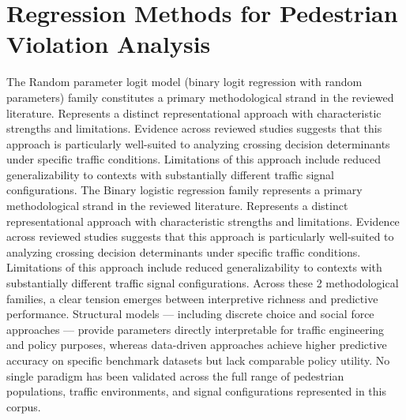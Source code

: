 \documentclass{article}
\begin{document}
\section{Regression Methods for Pedestrian Violation Analysis}
The Random parameter logit model (binary logit regression with random parameters) family constitutes a primary methodological strand in the reviewed literature. Represents a distinct representational approach with characteristic strengths and limitations. Evidence across reviewed studies suggests that this approach is particularly well-suited to analyzing crossing decision determinants under specific traffic conditions. Limitations of this approach include reduced generalizability to contexts with substantially different traffic signal configurations. The Binary logistic regression family represents a primary methodological strand in the reviewed literature. Represents a distinct representational approach with characteristic strengths and limitations. Evidence across reviewed studies suggests that this approach is particularly well-suited to analyzing crossing decision determinants under specific traffic conditions. Limitations of this approach include reduced generalizability to contexts with substantially different traffic signal configurations. Across these 2 methodological families, a clear tension emerges between interpretive richness and predictive performance. Structural models — including discrete choice and social force approaches — provide parameters directly interpretable for traffic engineering and policy purposes, whereas data-driven approaches achieve higher predictive accuracy on specific benchmark datasets but lack comparable policy utility. No single paradigm has been validated across the full range of pedestrian populations, traffic environments, and signal configurations represented in this corpus.
\end{document}
